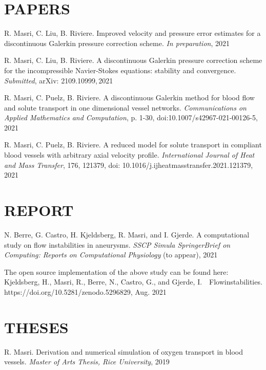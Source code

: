 \documentclass[margin]{res}
\begin{document}
\begin{resume}
\section{PAPERS}
\par R. Masri, C. Liu, B. Riviere. Improved velocity and pressure error estimates for a discontinuous Galerkin pressure correction scheme. \textit{In preparation}, 2021 
\par R. Masri, C. Liu, B. Riviere. A discontinuous Galerkin pressure correction scheme for the incompressible Navier-Stokes equations: stability and convergence. \textit{Submitted},  arXiv: 2109.10999,\,2021
\par R. Masri, C. Puelz, B. Riviere. A discontinuous Galerkin method for blood flow and solute transport in one dimensional vessel networks. 
 \textit{Communications on Applied Mathematics and Computation}, p. 1-30, doi:10.1007/s42967-021-00126-5, 2021
\par
R. Masri, C. Puelz, B. Riviere. A reduced model for solute transport in compliant blood vessels with arbitrary axial velocity profile. \textit{International Journal of Heat and Mass Transfer}, 176, 121379, doi: 10.1016/j.ijheatmasstransfer.2021.121379, 2021

\section{REPORT} 
\par N. Berre, G. Castro, H.  Kjeldsberg, R. Masri, and I. Gjerde. A computational study on flow instabilities in aneurysms. \textit{SSCP Simula SpringerBrief on Computing: Reports on Computational Physiology} (to appear), 2021 
\par  The open source implementation of the above study can be found here: \\  
Kjeldsberg, H., Masri, R., Berre, N., Castro, G., and Gjerde, I. \,\,  Flowinstabilities. \\ https://doi.org/10.5281/zenodo.5296829, Aug. 2021

\section{THESES}
\par  R. Masri. Derivation and numerical simulation of oxygen transport in blood vessels. \textit{ Master of Arts Thesis, Rice University}, 2019


\end{resume}
\end{document}
